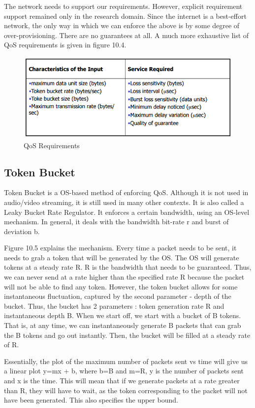 \documentclass[twoside]{article}
\begin{document}
The network needs to support our requirements. However, explicit requirement support remained only in the research domain. Since the internet is a best-effort network, the only way in which we can enforce the above is by some degree of over-provisioning. There are no guarantees at all. A much more exhaustive list of QoS requirements is given in figure 10.4.

\begin{figure}[t]
\includegraphics[scale=0.5]{Selection_006}
\centering
\caption{QoS Requirements}
\end{figure}


\subsection{Token Bucket}
Token Bucket is a OS-based method of enforcing QoS. Although it is not used in audio/video streaming, it is still used in many other contexts. It is also called a Leaky Bucket Rate Regulator. It enforces a certain bandwidth, using an OS-level mechanism. In general, it deals with the bandwidth bit-rate r and burst of deviation b.

Figure 10.5 explains the mechanism. Every time a packet needs to be sent, it needs to grab a token that will be generated by the OS. The OS will generate tokens at a steady rate R. R is the bandwidth that needs to be guaranteed. Thus, we can never send at a rate higher than the specified rate R because the packet will not be able to find any token. However, the token bucket allows for some instantaneous fluctuation, captured by the second parameter - depth of the bucket. Thus, the bucket has 2 parameters : token generation rate R and instantaneous depth B. When we start off, we start with a bucket of B tokens. That is, at any time, we can instantaneously generate B packets that can grab the B tokens and go out instantly. Then, the bucket will be filled at a steady rate of R. 

Essentially, the plot of the maximum number of packets sent vs time will give us a linear plot y=mx + b, where b=B and m=R, y is the number of packets sent and x is the time. This will mean that if we generate packets at a rate greater than R, they will have to wait, as the token corresponding to the packet will not have been generated. This also specifies the upper bound.
\end{document}
